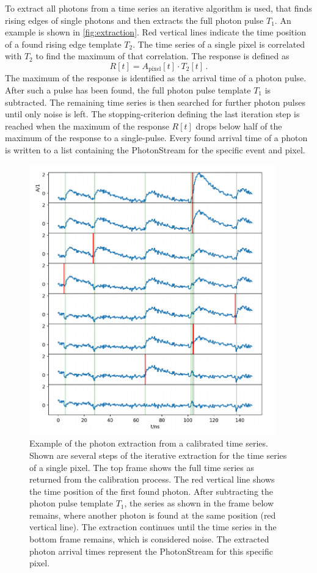 To extract all photons from a time series an iterative algorithm is used, that
finds rising edges of single photons and then extracts the full photon pulse
$T_1$. An example is shown in \autoref{fig:extraction}. Red vertical lines
indicate the time position of a found rising edge template $T_2$. The time
series of a single pixel is correlated with $T_2$ to find the maximum of that
correlation. The response is defined as
%
\begin{equation}
  R[t] = A_\text{pixel}[t]\cdot T_2[t] \, .
\end{equation}
%
The maximum of the response is identified as the arrival time of a photon pulse.
After such a pulse has been found, the full photon pulse template $T_1$ is
subtracted. The remaining time series is then searched for further photon
pulses until only noise is left. The stopping-criterion defining the last
iteration step is reached when the maximum of the response $R[t]$ drops below
half of the maximum of the response to a single-pulse.
Every found arrival time of a photon is written to a list containing the
PhotonStream for the specific event and pixel.
%
\begin{figure}
  \centering
  \includegraphics[width=0.95\textwidth]{Plots/photon_extraction_sebastian.png}
  \caption{Example of the photon extraction from a calibrated time series. Shown are several steps of the iterative extraction for the time series of a single pixel. The top frame shows the full time series as returned from the calibration process. The red vertical line shows the time position of the first found photon. After subtracting the photon pulse template $T_1$, the series as shown in the frame below remains, where another photon is found at the same position (red vertical line). The extraction continues until the time series in the bottom frame remains, which is considered noise. The extracted photon arrival times represent the PhotonStream for this specific pixel.}
  \label{fig:extraction}
\end{figure}
%
